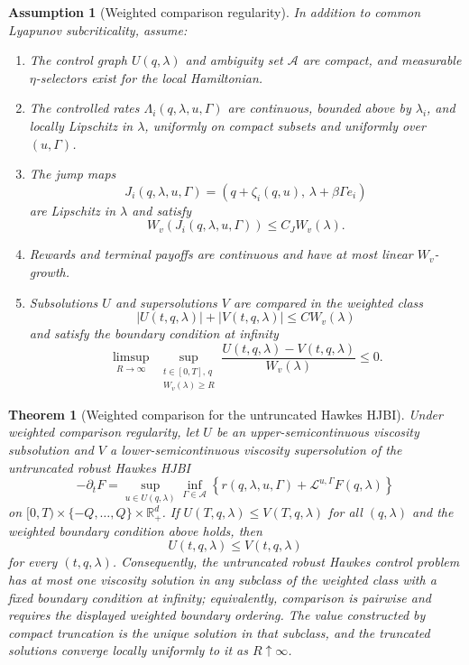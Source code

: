 \documentclass[11pt]{article}
\newtheorem{assumption}{Assumption}
\newtheorem{theorem}{Theorem}
\newcommand{\R}{\mathbb{R}}
\begin{document}
\begin{assumption}[Weighted comparison regularity]
In addition to common Lyapunov subcriticality, assume:
\begin{enumerate}
\item The control graph $U(q,\lambda)$ and ambiguity set $\mathcal A$ are
compact, and measurable $\eta$-selectors exist for the local Hamiltonian.
\item The controlled rates $\Lambda_i(q,\lambda,u,\Gamma)$ are continuous,
bounded above by $\lambda_i$, and locally Lipschitz in $\lambda$, uniformly on
compact subsets and uniformly over $(u,\Gamma)$.
\item The jump maps
\[
J_i(q,\lambda,u,\Gamma)=
(q+\zeta_i(q,u),\,\lambda+\beta\Gamma e_i)
\]
are Lipschitz in $\lambda$ and satisfy
\[
W_v(J_i(q,\lambda,u,\Gamma))\le C_J W_v(\lambda).
\]
\item Rewards and terminal payoffs are continuous and have at most linear
$W_v$-growth.
\item Subsolutions $U$ and supersolutions $V$ are compared in the weighted
class
\[
|U(t,q,\lambda)|+|V(t,q,\lambda)|\le C W_v(\lambda)
\]
and satisfy the boundary condition at infinity
\[
\limsup_{R\to\infty}\;
\sup_{\substack{t\in[0,T],\,q\\ W_v(\lambda)\ge R}}
\frac{U(t,q,\lambda)-V(t,q,\lambda)}{W_v(\lambda)}
\le 0.
\]
\end{enumerate}
\end{assumption}

\begin{theorem}[Weighted comparison for the untruncated Hawkes HJBI]
Under weighted comparison regularity, let $U$ be an upper-semicontinuous
viscosity subsolution and $V$ a lower-semicontinuous viscosity supersolution
of the untruncated robust Hawkes HJBI
\[
-\partial_t F=
\sup_{u\in U(q,\lambda)}\inf_{\Gamma\in\mathcal A}
\left\{
r(q,\lambda,u,\Gamma)+\mathcal L^{u,\Gamma}F(q,\lambda)
\right\}
\]
on $[0,T)\times\{-Q,\ldots,Q\}\times\R_+^d$. If
$U(T,q,\lambda)\le V(T,q,\lambda)$ for all $(q,\lambda)$ and the weighted
boundary condition above holds, then
\[
U(t,q,\lambda)\le V(t,q,\lambda)
\]
for every $(t,q,\lambda)$. Consequently, the untruncated robust Hawkes control
problem has at most one viscosity solution in any subclass of the weighted
class with a fixed boundary condition at infinity; equivalently, comparison is
pairwise and requires the displayed weighted boundary ordering. The value
constructed by compact truncation is the unique solution in that subclass, and
the truncated solutions converge locally uniformly to it as $R\uparrow\infty$.
\end{theorem}
\end{document}
